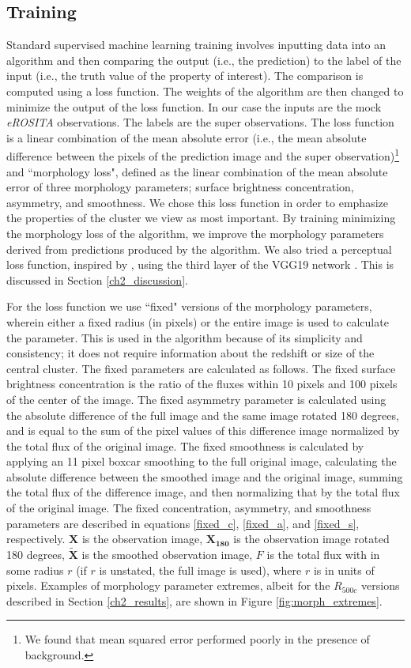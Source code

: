 \subsection{Training}\label{training}
Standard supervised machine learning training involves inputting data into an algorithm and then comparing the output (i.e., the prediction) to the label of the input (i.e., the truth value of the property of interest). The comparison is computed using a loss function. The weights of the algorithm are then changed to minimize the output of the loss function. In our case the inputs are the mock \textit{eROSITA} observations. The labels are the super observations. The loss function is a linear combination of the mean absolute error (i.e., the mean absolute difference between the pixels of the prediction image and the super observation)\footnote{We found that mean squared error performed poorly in the presence of background.} and ``morphology loss", defined as the linear combination of the mean absolute error of three morphology parameters; surface brightness concentration, asymmetry, and smoothness. We chose this loss function in order to emphasize the properties of the cluster we view as most important. By training minimizing the morphology loss of the algorithm, we improve the morphology parameters derived from predictions produced by the algorithm. We also tried a perceptual loss function, inspired by \cite{ploss}, using the third layer of the VGG19 network \cite{VGG19}. This is discussed in Section \ref{ch2_discussion}.

For the loss function we use ``fixed" versions of the morphology parameters, wherein either a fixed radius (in pixels) or the entire image is used to calculate the parameter. This is used in the algorithm because of its simplicity and consistency; it does not require information about the redshift or size of the central cluster. The fixed parameters are calculated as follows. The fixed surface brightness concentration is the ratio of the fluxes within 10 pixels and 100 pixels of the center of the image. The fixed asymmetry parameter is calculated using the absolute difference of the full image and the same image rotated 180 degrees, and is equal to the sum of the pixel values of this difference image normalized by the total flux of the original image. The fixed smoothness is calculated by applying an 11 pixel boxcar smoothing to the full original image, calculating the absolute difference between the smoothed image and the original image, summing the total flux of the difference image, and then normalizing that by the total flux of the original image. The fixed concentration, asymmetry, and smoothness parameters are described in equations \ref{fixed_c}, \ref{fixed_a}, and \ref{fixed_s}, respectively.  $\mathbf{X}$ is the observation image, $\mathbf{X_{180}}$ is the observation image rotated 180 degrees, $\mathbf{\tilde{X}}$ is the smoothed observation image, $F$ is the total flux with in some radius $r$ (if $r$ is unstated, the full image is used), where $r$ is in units of pixels. Examples of morphology parameter extremes, albeit for the $R_{500c}$ versions described in Section \ref{ch2_results}, are shown in Figure \ref{fig:morph_extremes}.

